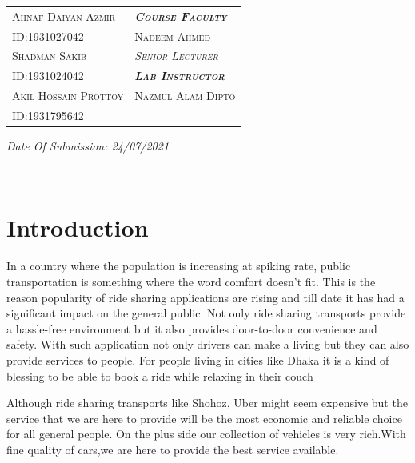 \documentclass[12pt,a4paper]{article}
\begin{document}
\begin{titlepage}
\begin{center}
\begin{tabular}{p{8.5cm} p{10cm}}
\textsc{ {\normalsize  Ahnaf Daiyan Azmir}} & \textsc{\normalsize \textbf{\textit{Course Faculty}}}\\

\textsc { \normalsize ID:1931027042} & \textsc{\normalsize Nadeem Ahmed}\\

\textsc{{ \normalsize Shadman Sakib}} & \textsc{\normalsize \textit{Senior Lecturer}}\\

\textsc{{ \normalsize ID:1931024042}} & \textsc{\normalsize \textbf{\textit{Lab Instructor}}}\\

\textsc{{ \normalsize Akil Hossain Prottoy}} & \textsc{\normalsize Nazmul Alam Dipto}\\

\textsc{{ \normalsize ID:1931795642}} & \\


\end{tabular}

\vspace{0.445cm}
\textit{{\small Date Of Submission: 24/07/2021}}

  
 \end{center}
 
 \end{titlepage}
 
 \newpage
 \,
 \section*{Introduction}
 In a country where the population is increasing at spiking rate, public transportation is something where the word comfort doesn’t fit. This is the reason popularity of ride sharing applications are rising and till date it has had a significant impact on the general public. Not only ride sharing transports provide a hassle-free environment but it also provides door-to-door convenience and safety. With such application not only drivers can make a living but they can also provide services to people. For people living in cities like Dhaka it is a kind of blessing to be able to book a ride while relaxing in their couch\
\vspace{-0.3cm}\begin{flushright}Although ride sharing transports like Shohoz, Uber might seem expensive but the service that we are here to provide will be the most economic and reliable choice for all general people. On the plus side our collection of vehicles is very rich.With fine quality of cars,we are here to provide the best service available.\end{flushright}
\,
\,
\end{document}
